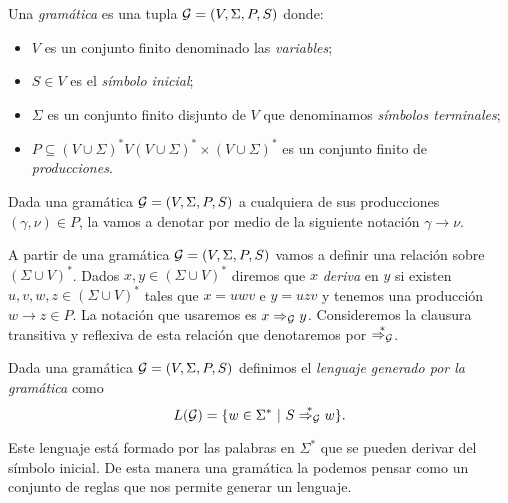 \documentclass[tesis.tex]{subfiles}
\begin{document}
\begin{deff}
	Una \emph{gramática} es una tupla ${\cal G} = (V, \Sigma, P, S)$ donde:
	\begin{itemize}
		\item $V$ es un conjunto finito denominado las \emph{variables};
		\item $S \in V$ es el \emph{símbolo inicial};
		\item $\Sigma$ es un conjunto finito disjunto de $V$ que denominamos \emph{símbolos terminales};
		\item $P \subseteq (V \cup \Sigma)^*V(V \cup \Sigma)^* \times (V \cup \Sigma)^*$ es un conjunto finito de \emph{producciones}.
	\end{itemize}
\end{deff}

Dada una gramática ${\cal G} = (V, \Sigma, P, S)$ a cualquiera de sus producciones $(\gamma, \nu) \in P$, la vamos a denotar por medio de la siguiente notación $\gamma \to \nu$. 

A partir de una gramática ${\cal G} = (V, \Sigma, P, S)$ vamos a definir una relación sobre $(\Sigma \cup V)^*$. 
Dados $x,y \in (\Sigma \cup V)^*$ diremos que $x$ \emph{deriva} en $y$ si existen $u,v,w,z \in (\Sigma \cup V)^*$ tales que $x = uwv$ e $y=uzv$ y tenemos una producción $w \to z \in P$.
La notación que usaremos es $x \Rightarrow_{\cal G} y$. 
Consideremos la clausura transitiva y reflexiva de esta relación que denotaremos por $\overset{*}{\Rightarrow_{\cal G}}$.



\begin{deff}
	Dada una gramática ${\cal G} = (V, \Sigma, P, S)$  definimos el \emph{lenguaje generado por la gramática} como
	\[
	L({\cal G}) = \{ w \in \Sigma^* \ | \ S \overset{*}{\Rightarrow_{\cal G}} w   \}.
	\]
\end{deff}

Este lenguaje está formado por las palabras en $\Sigma^*$ que se pueden derivar del símbolo inicial.
De esta manera una gramática la podemos pensar como un conjunto de reglas que nos permite generar un lenguaje. 
 
\end{document}
